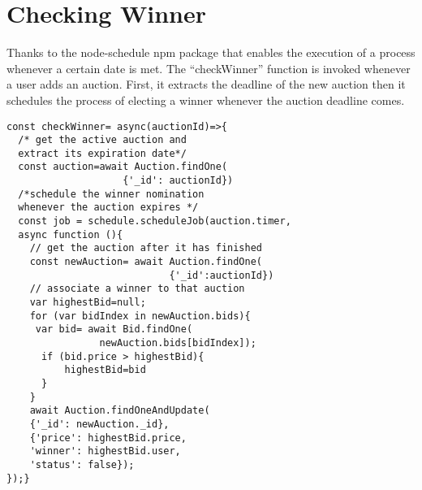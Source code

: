 \documentclass[12pt]{article}
\begin{document}
\begin{table}[htp]

\centering
{}
\caption{\label{table 1}API end-points}
\end{table}
\newpage
\section{Checking Winner}
Thanks to the node-schedule npm package that enables the execution of a process whenever a certain date is met. The “checkWinner” function is invoked whenever a user adds an auction. First, it extracts the deadline of the new auction then it schedules the process of electing a winner whenever the auction deadline comes.
\begin{lstlisting}
const checkWinner= async(auctionId)=>{
  /* get the active auction and 
  extract its expiration date*/
  const auction=await Auction.findOne(
                    {'_id': auctionId})
  /*schedule the winner nomination 
  whenever the auction expires */
  const job = schedule.scheduleJob(auction.timer,
  async function (){
    // get the auction after it has finished 
    const newAuction= await Auction.findOne(
                            {'_id':auctionId})
    // associate a winner to that auction 
    var highestBid=null;
    for (var bidIndex in newAuction.bids){
     var bid= await Bid.findOne(
                newAuction.bids[bidIndex]);
      if (bid.price > highestBid){
          highestBid=bid
      }
    }
    await Auction.findOneAndUpdate(
    {'_id': newAuction._id},
    {'price': highestBid.price,
    'winner': highestBid.user,
    'status': false});
});}
\end{lstlisting}
\end{document}
